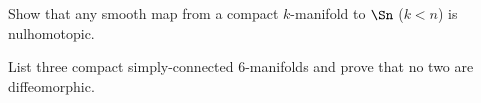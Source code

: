 \begin{alist}
\item Show that any smooth map from a compact $k$-manifold to $\Sn$
($k<n$) is nulhomotopic.
\item List three compact simply-connected $6$-manifolds and prove that
no two are diffeomorphic.
\end{alist}
